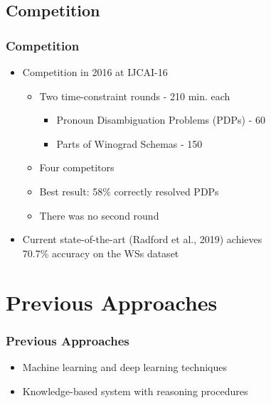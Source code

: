 \documentclass[c,8pt,xcolor...,x11names]{beamer}
\begin{document}
\subsection{Competition}

\begin{frame}
\frametitle{Competition}
	\begin{itemize}
	\normalsize
	\item Competition in 2016 at IJCAI-16
	\begin{itemize}
		\normalsize
		\item Two time-constraint rounds - 210 min. each
		\begin{itemize}
			\normalsize
			\item Pronoun Disambiguation Problems (PDPs) - 60
			\item Parts of Winograd Schemas - 150
		\end{itemize}
		\item Four competitors
		\item Best result: 58\% correctly resolved PDPs
		\item There was no second round
		
	\end{itemize}
	
	\item Current \alert{state-of-the-art} (Radford et al., 2019) achieves \\ 70.7\% accuracy on the WSs dataset
\end{itemize}
\end{frame}

\section{Previous Approaches}

\begin{frame}
\frametitle{Previous Approaches}
\begin{itemize}
	\item Machine learning and deep learning techniques
	\item Knowledge-based system with reasoning procedures
\end{itemize}


\end{frame}
\end{document}
